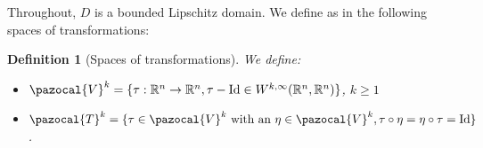 \documentclass[english,a4paper,9pt,oneside]{scrbook}	%
\theoremstyle{break}
\newtheorem{defn}[equation]{Definition}
\theoremstyle{remark}
\newcommand{\mR}{\mathbb{R}}
\newcommand{\cV}{\pazocal{V}}
\newcommand{\cT}{\pazocal{T}}
\newcommand{\id}{\text{Id}}
\begin{document}
\begin{appendices}
Throughout, $D$ is a bounded Lipschitz domain. We define as in \cite{murat} the following spaces of transformations:

\begin{defn}[Spaces of transformations]
We define:
\begin{itemize}	
	\item $\cV^k=\{\tau: \mR^n \rightarrow \mR^n, \tau-\id \in W^{k,\infty}(\mR^n,\mR^n)\}$, $k\geq 1$
	\item $\cT^k=\{\tau \in \cV^k \text{ with an } \eta \in \cV^k, \tau \circ \eta = \eta \circ \tau = \id\}$.
\end{itemize} 
\end{defn}


\end{appendices}
\end{document}
